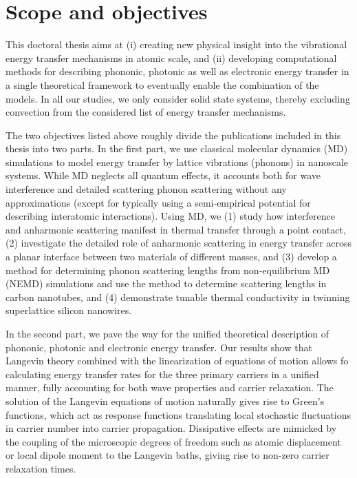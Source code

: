 \section{Scope and objectives}

This doctoral thesis aims at (i) creating new physical insight into the vibrational energy transfer mechanisms in atomic scale, and (ii) developing computational methods for describing phononic, photonic as well as electronic energy transfer in a single theoretical framework to eventually enable the combination of the models. In all our studies, we only consider solid state systems, thereby excluding convection from the considered list of energy transfer mechanisms. %

The two objectives listed above roughly divide the publications included in this thesis into two parts. In the first part, we use classical molecular dynamics (MD) simulations to model energy transfer by lattice vibrations (phonons) in nanoscale systems. While MD neglects all quantum effects, it accounts both for wave interference and detailed scattering phonon scattering without any approximations (except for typically using a semi-empirical potential for describing interatomic interactions). Using MD, we (1) study how interference and anharmonic scattering manifest in thermal transfer through a point contact, (2) investigate the detailed role of anharmonic scattering in energy transfer across a planar interface between two materials of different masses, and (3) develop a method for determining phonon scattering lengths from non-equilibrium MD (NEMD) simulations and use the method to determine scattering lengths in carbon nanotubes, and (4) demonstrate tunable thermal conductivity in twinning superlattice silicon nanowires.

In the second part, we pave the way for the unified theoretical description of phononic, photonic and electronic energy transfer. Our results show that Langevin theory \cite{langevin,zwanzig} combined with the linearization of equations of motion allows fo calculating energy transfer rates for the three primary carriers in a unified manner, fully accounting for both wave properties and carrier relaxation. The solution of the Langevin equations of motion naturally gives rise to Green's functions, which act as response functions translating local stochastic fluctuations in carrier number into carrier propagation. Dissipative effects are mimicked by the coupling of the microscopic degrees of freedom such as atomic displacement or local dipole moment to the Langevin baths, giving rise to non-zero carrier relaxation times.

